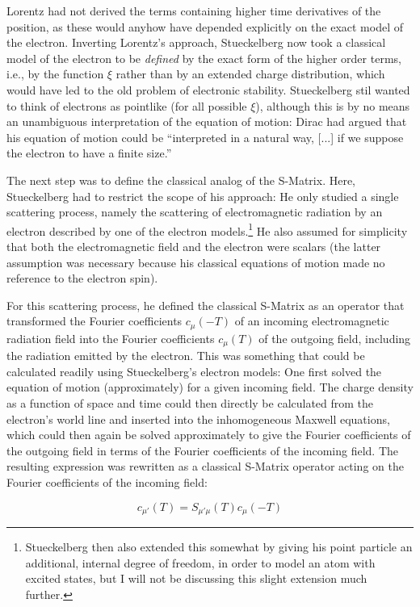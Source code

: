\documentclass[12pt]{article}
\begin{document}
Lorentz had not derived the terms containing higher time derivatives of the position, as these would anyhow have depended explicitly on the exact model of the electron. Inverting Lorentz's approach, Stueckelberg now took a classical model of the electron to be \emph{defined} by the exact form of the higher order terms, i.e., by the function $\xi$ rather than by an extended charge distribution, which would have led to the old problem of electronic stability. Stueckelberg stil wanted to think of electrons as pointlike (for all possible $\xi$), although this is by no means an unambiguous interpretation of the equation of motion: Dirac had argued that his equation of motion could be ``interpreted in a natural way, [...] if we suppose the electron to have a finite size.''

The next step was to define the classical analog of the S-Matrix. Here, Stueckelberg had to restrict the scope of his approach: He only studied a single scattering process, namely the scattering of electromagnetic radiation by an electron described by one of the electron models.\footnote{Stueckelberg then also extended this somewhat by giving his point particle an additional, internal degree of freedom, in order to model an atom with excited states, but I will not be discussing this slight extension much further.} He also assumed for simplicity that both the electromagnetic field and the electron were scalars (the latter assumption was necessary because his classical equations of motion made no reference to the electron spin).

For this scattering process, he defined the classical S-Matrix as an operator that transformed the Fourier coefficients $c_{\mu} (-T)$ of an incoming electromagnetic radiation field into the Fourier coefficients $c_{\mu} (T)$ of the outgoing field, including the radiation emitted by the electron. This was something that could be calculated readily using Stueckelberg's electron models: One first solved the equation of motion (approximately) for a given incoming field. The charge density as a function of space and time could then directly be calculated from the electron's world line and inserted into the inhomogeneous Maxwell equations, which could then again be solved approximately to give the Fourier coefficients of the outgoing field in terms of the Fourier coefficients of the incoming field. The resulting expression was rewritten as a classical S-Matrix operator acting on the Fourier coefficients of the incoming field:

\begin{equation}
c_{\mu'} (T) = S_{\mu' \mu}(T) c_{\mu}(-T)
\end{equation}
\end{document}
